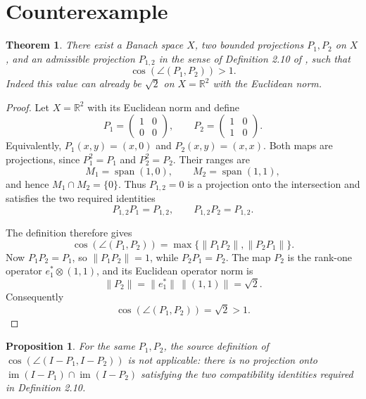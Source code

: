 \documentclass[11pt]{article}
\newtheorem{theorem}{Theorem}
\newtheorem{proposition}{Proposition}
\begin{document}
\section{Counterexample}

\begin{theorem}
\label{thm:cosine-exceeds-one}
There exist a Banach space \(X\), two bounded projections \(P_1,P_2\) on \(X\),
and an admissible projection \(P_{1,2}\) in the sense of Definition 2.10 of
\cite{oppenheim1512}, such that
\[
\cos(\angle(P_1,P_2))>1.
\]
Indeed this value can already be \(\sqrt 2\) on \(X=\mathbb R^2\) with the
Euclidean norm.
\end{theorem}

\begin{proof}
Let \(X=\mathbb R^2\) with its Euclidean norm and define
\[
P_1=
\begin{pmatrix}
1&0\\
0&0
\end{pmatrix},
\qquad
P_2=
\begin{pmatrix}
1&0\\
1&0
\end{pmatrix}.
\]
Equivalently, \(P_1(x,y)=(x,0)\) and \(P_2(x,y)=(x,x)\).  Both maps are
projections, since \(P_1^2=P_1\) and \(P_2^2=P_2\).  Their ranges are
\[
M_1=\operatorname{span}(1,0),
\qquad
M_2=\operatorname{span}(1,1),
\]
and hence \(M_1\cap M_2=\{0\}\).  Thus \(P_{1,2}=0\) is a projection onto the
intersection and satisfies the two required identities
\[
P_{1,2}P_1=P_{1,2},\qquad P_{1,2}P_2=P_{1,2}.
\]

The definition therefore gives
\[
\cos(\angle(P_1,P_2))
=
\max\{\|P_1P_2\|,\|P_2P_1\|\}.
\]
Now \(P_1P_2=P_1\), so \(\|P_1P_2\|=1\), while \(P_2P_1=P_2\).  The map
\(P_2\) is the rank-one operator \(e_1^\ast\otimes(1,1)\), and its Euclidean
operator norm is
\[
\|P_2\|=\|e_1^\ast\|\,\|(1,1)\|=\sqrt2.
\]
Consequently
\[
\cos(\angle(P_1,P_2))=\sqrt2>1.
\]
\end{proof}

\begin{proposition}
\label{prop:complements-not-defined}
For the same \(P_1,P_2\), the source definition of
\(\cos(\angle(I-P_1,I-P_2))\) is not applicable: there is no projection onto
\(\operatorname{im}(I-P_1)\cap\operatorname{im}(I-P_2)\) satisfying the two
compatibility identities required in Definition 2.10.
\end{proposition}
\end{document}
